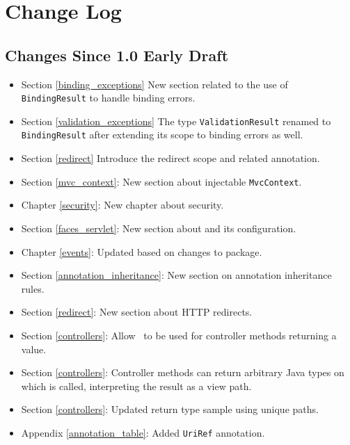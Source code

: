 \chapter{Change Log}

\section{Changes Since 1.0 Early Draft}

\begin{itemize}
\item Section \ref{binding_exceptions} New section related to the use of {\tt BindingResult}
to handle binding errors.
\item Section \ref{validation_exceptions} The type {\tt ValidationResult} renamed to 
{\tt BindingResult} after extending its scope to binding errors as well. 
\item Section \ref{redirect} Introduce the redirect scope and related annotation.
\item Section \ref{mvc_context}: New section about injectable {\tt MvcContext}.
\item Chapter \ref{security}: New chapter about security.
\item Section \ref{faces_servlet}: New section about  and its configuration.
\item Chapter \ref{events}: Updated based on changes to  package.
\item Section \ref{annotation_inheritance}: New section on annotation inheritance rules.
\item Section \ref{redirect}: New section about HTTP redirects.
\item Section \ref{controllers}: Allow \View\ to be used for controller methods returning a 
 value. 
\item Section \ref{controllers}: Controller methods can return arbitrary Java types on which 
 is called, interpreting the result as a view path.
\item Section \ref{controllers}: Updated return type sample using unique paths.
\item Appendix \ref{annotation_table}: Added {\tt UriRef} annotation.
\end{itemize}
